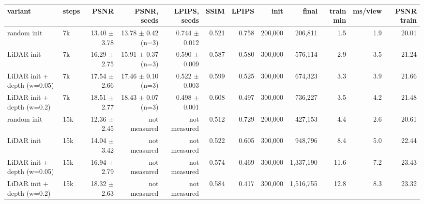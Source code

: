 \footnotesize\renewcommand{\arraystretch}{0.92}
\begin{tabular}{llrrrrrrrrrr}
\toprule
variant & steps & PSNR & PSNR, seeds & LPIPS, seeds & SSIM & LPIPS & init & final & train min & ms/view & PSNR train \\
\midrule
random init & 7k & 13.40 $\pm$ 3.78 & 13.78 $\pm$ 0.42 (n=3) & 0.744 $\pm$ 0.012 & 0.521 & 0.758 & 200,000 & 206,811 & 1.5 & 1.9 & 20.01 \\
LiDAR init & 7k & 16.29 $\pm$ 2.75 & 15.91 $\pm$ 0.37 (n=3) & 0.590 $\pm$ 0.009 & 0.587 & 0.580 & 300,000 & 576,114 & 2.9 & 3.5 & 21.24 \\
LiDAR init + depth (w=0.05) & 7k & 17.54 $\pm$ 2.66 & 17.46 $\pm$ 0.10 (n=3) & 0.522 $\pm$ 0.003 & 0.599 & 0.525 & 300,000 & 674,323 & 3.3 & 3.9 & 21.66 \\
LiDAR init + depth (w=0.2) & 7k & 18.51 $\pm$ 2.77 & 18.43 $\pm$ 0.07 (n=3) & 0.498 $\pm$ 0.001 & 0.608 & 0.497 & 300,000 & 736,227 & 3.5 & 4.2 & 21.48 \\
\midrule
random init & 15k & 12.36 $\pm$ 2.45 & not measured & not measured & 0.512 & 0.729 & 200,000 & 427,153 & 4.4 & 2.6 & 20.61 \\
LiDAR init & 15k & 14.04 $\pm$ 3.42 & not measured & not measured & 0.522 & 0.605 & 300,000 & 948,796 & 8.4 & 5.0 & 22.44 \\
LiDAR init + depth (w=0.05) & 15k & 16.94 $\pm$ 2.79 & not measured & not measured & 0.574 & 0.469 & 300,000 & 1,337,190 & 11.6 & 7.2 & 23.43 \\
LiDAR init + depth (w=0.2) & 15k & 18.32 $\pm$ 2.63 & not measured & not measured & 0.584 & 0.417 & 300,000 & 1,516,755 & 12.8 & 8.3 & 23.32 \\
\bottomrule
\end{tabular}
